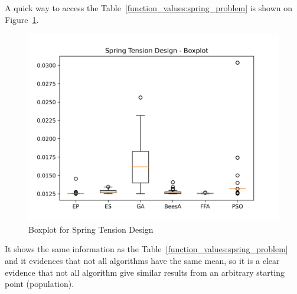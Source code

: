 A quick way to access the Table~\ref{function_values:spring_problem} is
shown on Figure~\ref{fig:spring_tension_design_boxplot}.

\begin{figure}[H]
\centering
\caption{Boxplot for Spring Tension Design}
\label{fig:spring_tension_design_boxplot}
\includegraphics[scale=0.5]{images/spring_problem_boxplot.png}
\end{figure}

It shows the same information as the Table~\ref{function_values:spring_problem}
and it evidences that not all algorithms have the same mean, so it is a clear evidence
that not all algorithm give similar results from an arbitrary starting point (population).